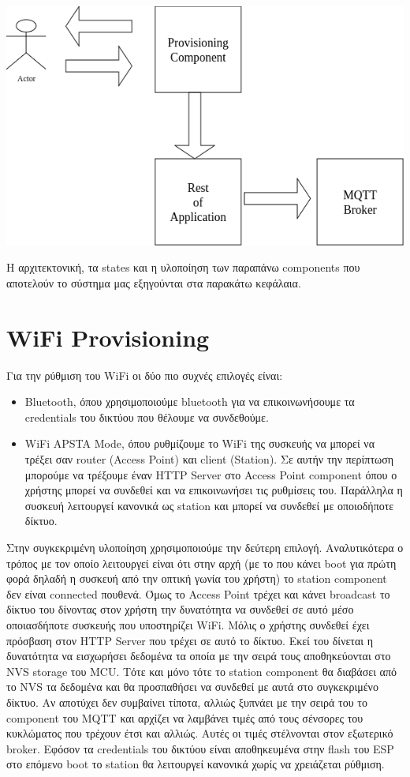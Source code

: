 \documentclass[a4paper,12pt]{article}
\begin{document}
\includegraphics[scale=0.5]{categorize.drawio.png}

\vspace{2mm}

Η αρχιτεκτονική, τα states και η υλοποίηση των παραπάνω components που αποτελούν το σύστημα μας εξηγούνται στα παρακάτω
κεφάλαια.

\section{WiFi Provisioning}

Για την ρύθμιση του WiFi οι δύο πιο συχνές επιλογές είναι:

\begin{itemize}
\item Bluetooth, όπου χρησιμοποιούμε bluetooth για να επικοινωνήσουμε τα credentials του δικτύου που θέλουμε να συνδεθούμε.
\item WiFi APSTA Mode, όπου ρυθμίζουμε το WiFi της συσκευής να μπορεί να τρέξει σαν router (Access Point) και client (Station).
  Σε αυτήν την περίπτωση μπορούμε να τρέξουμε έναν HTTP Server στο Access Point component όπου ο χρήστης μπορεί να συνδεθεί και να
  επικοινωνήσει τις ρυθμίσεις του. Παράλληλα η συσκευή λειτουργεί κανονικά ως station και μπορεί να συνδεθεί με οποιοδήποτε δίκτυο.
\end{itemize}

Στην συγκεκριμένη υλοποίηση χρησιμοποιούμε την δεύτερη επιλογή. Αναλυτικότερα ο τρόπος με τον οποίο λειτουργεί είναι ότι στην αρχή
(με το που κάνει boot για πρώτη φορά δηλαδή η συσκευή από την οπτική γωνία του χρήστη) το station component δεν είναι connected πουθενά.
Όμως το Access Point τρέχει και κάνει broadcast το δίκτυο του δίνοντας στον χρήστη την δυνατότητα να συνδεθεί σε αυτό μέσο οποιασδήποτε
συσκευής που υποστηρίζει WiFi. Μόλις ο χρήστης συνδεθεί έχει πρόσβαση στον HTTP Server που τρέχει σε αυτό το δίκτυο. Εκεί του
δίνεται η δυνατότητα να εισχωρήσει δεδομένα τα οποία με την σειρά τους αποθηκεύονται στο NVS storage του MCU. Τότε και μόνο τότε
το station component θα διαβάσει από το NVS τα δεδομένα και θα προσπαθήσει να συνδεθεί με αυτά στο συγκεκριμένο δίκτυο. Αν αποτύχει
δεν συμβαίνει τίποτα, αλλιώς ξυπνάει με την σειρά του το component του MQTT και αρχίζει να λαμβάνει τιμές από τους σένσορες του κυκλώματος
που τρέχουν έτσι και αλλιώς. Αυτές οι τιμές στέλνονται στον εξωτερικό broker. Εφόσον τα credentials του δικτύου είναι αποθηκευμένα στην
flash του ESP στο επόμενο boot το station θα λειτουργεί κανονικά χωρίς να χρειάζεται ρύθμιση.
\end{document}
